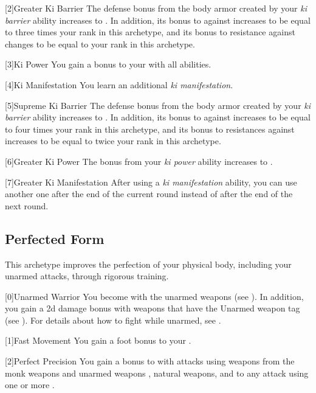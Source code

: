         [2]{Greater Ki Barrier} 
        The defense bonus from the body armor created by your \textit{ki barrier} ability increases to .
        In addition, its bonus to  against  increases to be equal to three times your rank in this archetype, and its bonus to resistance against  changes to be equal to your rank in this archetype.

        [3]{Ki Power}
        You gain a  bonus to your  with all abilities.

        [4]{Ki Manifestation}
        You learn an additional \textit{ki manifestation}.

        [5]{Supreme Ki Barrier}
        The defense bonus from the body armor created by your \textit{ki barrier} ability increases to .
        In addition, its bonus to  against  increases to be equal to four times your rank in this archetype, and its bonus to resistances against  increases to be equal to twice your rank in this archetype.

        [6]{Greater Ki Power} The bonus from your \textit{ki power} ability increases to .

        [7]{Greater Ki Manifestation} After using a \textit{ki manifestation} ability, you can use another one after the end of the current round instead of after the end of the next round.

    \newpage
    \subsection{Perfected Form}
        This archetype improves the perfection of your physical body, including your unarmed attacks, through rigorous training.

        [0]{Unarmed Warrior} You become  with the unarmed weapons  (see ).
        In addition, you gain a \plus2d damage bonus with weapons that have the Unarmed weapon tag (see ).
        For details about how to fight while unarmed, see .

        [1]{Fast Movement} You gain a  foot bonus to your .

        [2]{Perfect Precision} You gain a  bonus to  with attacks using weapons from the monk weapons and unarmed weapons , natural weapons, and to any attack using one or more .

